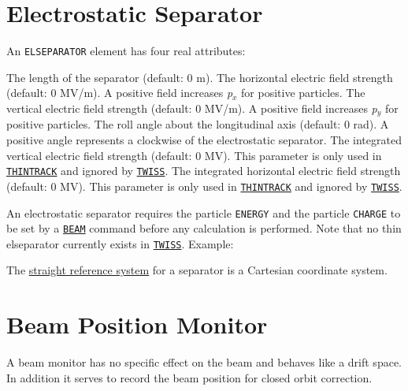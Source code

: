 


\section{Electrostatic Separator}
\label{sec:separator}\label{sec:elseparator}


An \texttt{ELSEPARATOR} element has four real attributes:
\begin{madlist}
    The length of the separator (default: 0 m).
    The horizontal electric field strength (default: 0 MV/m).
     A positive field increases \textit{p$_x$} for positive particles.
    The vertical electric field strength (default: 0 MV/m).
     A positive field increases \textit{p$_y$} for positive particles.
    The roll angle about the longitudinal axis (default: 0
     rad). A positive angle represents a clockwise of the electrostatic
     separator.
    The integrated vertical electric field strength (default: 0 MV).
    This parameter is only used in \hyperref[sec:trackoverview]{\texttt{THINTRACK}} and ignored by \hyperref[chap:twiss]{\texttt{TWISS}}.
     The integrated horizontal electric field strength (default: 0 MV).
    This parameter is only used in \hyperref[sec:trackoverview]{\texttt{THINTRACK}} and ignored by \hyperref[chap:twiss]{\texttt{TWISS}}.
\end{madlist}
An electrostatic separator requires the particle \texttt{ENERGY} and the
particle \texttt{CHARGE} to be set by a
\hyperref[sec:beam]{\texttt{BEAM}} command before any calculation is
performed. Note that no thin elseparator currently exists in \hyperref[chap:twiss]{\texttt{TWISS}}.
Example:

The \hyperref[subsec:local-straight]{straight reference system} for a
separator is a Cartesian coordinate system.


\section{Beam Position Monitor}
\label{sec:monitor}

A beam monitor has no specific effect on the beam and behaves like a
drift space.
In addition it serves to record the beam position for closed orbit
correction.

